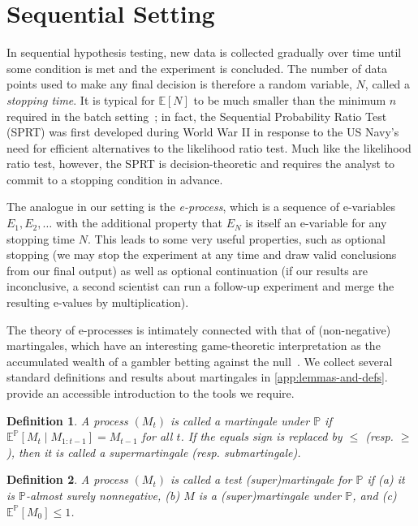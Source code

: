 \documentclass{article}
\newcommand{\Null}{\mathbb{P}}
\newcommand{\E}{\mathbb{E}}
\newtheorem{definition}{Definition}[section]
\begin{document}
\section{Sequential Setting}\label{sec:sequential}

In sequential hypothesis testing, new data is collected gradually over time until some condition is met and the experiment is concluded. The number of data points used to make any final decision is therefore a random variable, $N$, called a \emph{stopping time}. It is typical for $\E[N]$ to be much smaller than the minimum $n$ required in the batch setting~\citep{wald1948optimum}; in fact, the Sequential Probability Ratio Test (SPRT) \citep{wald1945} was first developed during World War II in response to the US Navy's need for efficient alternatives to the likelihood ratio test. Much like the likelihood ratio test, however, the SPRT is decision-theoretic and requires the analyst to commit to a stopping condition in advance.

The analogue in our setting is the \emph{e-process}, which is a sequence of e-variables $E_1, E_2, \ldots$ with the additional property that $E_N$ is itself an e-variable for any stopping time $N$. This leads to some very useful properties, such as optional stopping (we may stop the experiment at any time and draw valid conclusions from our final output) as well as optional continuation (if our results are inconclusive, a second scientist can run a follow-up experiment and merge the resulting e-values by multiplication).  

The theory of e-processes is intimately connected with that of (non-negative) martingales, which have an interesting game-theoretic interpretation as the accumulated wealth of a gambler betting against the null~\citep{shafer2021testing}. We collect several standard definitions and results about martingales in \cref{app:lemmas-and-defs}. \citet[Chapter 12]{upfal2005probability} provide an accessible introduction to the tools we require. 

\begin{definition}
    A process $(M_t)$ is called a \emph{martingale} under $\Null$ if $\E^\Null[M_t \mid M_{1:t-1}] = M_{t-1}$ for all $t$. 
    If the equals sign is replaced by $\leq$ (resp. $\geq$), then it is called a \emph{supermartingale} (resp. \emph{submartingale}).
\end{definition}

\begin{definition}
    A process $(M_t)$ is called a \emph{test (super)martingale for $\Null$} if (a) it is $\Null$-almost surely nonnegative, (b) $M$ is a (super)martingale under $\Null$, and (c) $\mathbb{E}^\Null[M_0] \leq 1$.
\end{definition}
\end{document}
